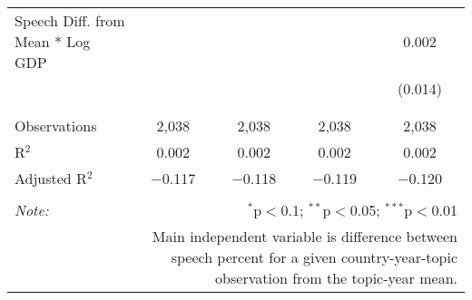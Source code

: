 \begin{table}[!htbp]
\begin{tabular}{@{\extracolsep{5pt}}lcccc}
 Speech Diff. from Mean * Log GDP &  &  &  & 0.002 \\ 
  &  &  &  & (0.014) \\ 
  & & & & \\ 
\hline \\[-1.8ex] 
Observations & 2,038 & 2,038 & 2,038 & 2,038 \\ 
R$^{2}$ & 0.002 & 0.002 & 0.002 & 0.002 \\ 
Adjusted R$^{2}$ & $-$0.117 & $-$0.118 & $-$0.119 & $-$0.120 \\ 
\hline 
\hline \\[-1.8ex] 
\textit{Note:}  & \multicolumn{4}{r}{$^{*}$p$<$0.1; $^{**}$p$<$0.05; $^{***}$p$<$0.01} \\ 
 & \multicolumn{4}{r}{Main independent variable is difference between speech percent for a given country-year-topic observation from the topic-year mean.} \\ 
\end{tabular} 
\end{table} 
